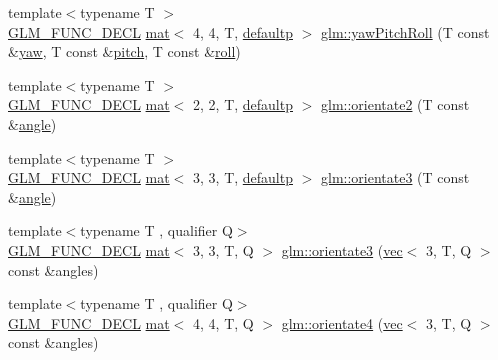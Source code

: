 \begin{DoxyCompactItemize}
\item 
{\footnotesize template$<$typename T $>$ }\\\mbox{\hyperlink{setup_8hpp_ab2d052de21a70539923e9bcbf6e83a51}{G\+L\+M\+\_\+\+F\+U\+N\+C\+\_\+\+D\+E\+CL}} \mbox{\hyperlink{structglm_1_1mat}{mat}}$<$ 4, 4, T, \mbox{\hyperlink{namespaceglm_a36ed105b07c7746804d7fdc7cc90ff25a9d21ccd8b5a009ec7eb7677befc3bf51}{defaultp}} $>$ \mbox{\hyperlink{group__gtx__euler__angles_gae6aa26ccb020d281b449619e419a609e}{glm\+::yaw\+Pitch\+Roll}} (T const \&\mbox{\hyperlink{group__gtc__quaternion_ga53feffeb4001b99e36e216522e465e9e}{yaw}}, T const \&\mbox{\hyperlink{group__gtc__quaternion_ga9bd78e5fe153d07e39fb4c83e73dba73}{pitch}}, T const \&\mbox{\hyperlink{group__gtc__quaternion_ga3ff93afbd9cc29f2ad217f2228e8a95b}{roll}})
\item 
{\footnotesize template$<$typename T $>$ }\\\mbox{\hyperlink{setup_8hpp_ab2d052de21a70539923e9bcbf6e83a51}{G\+L\+M\+\_\+\+F\+U\+N\+C\+\_\+\+D\+E\+CL}} \mbox{\hyperlink{structglm_1_1mat}{mat}}$<$ 2, 2, T, \mbox{\hyperlink{namespaceglm_a36ed105b07c7746804d7fdc7cc90ff25a9d21ccd8b5a009ec7eb7677befc3bf51}{defaultp}} $>$ \mbox{\hyperlink{group__gtx__euler__angles_gae16738a9f1887cf4e4db6a124637608d}{glm\+::orientate2}} (T const \&\mbox{\hyperlink{_s_d_l__opengl__glext_8h_a9e06c1f76a20fed54ca742cd25cb02c4}{angle}})
\item 
{\footnotesize template$<$typename T $>$ }\\\mbox{\hyperlink{setup_8hpp_ab2d052de21a70539923e9bcbf6e83a51}{G\+L\+M\+\_\+\+F\+U\+N\+C\+\_\+\+D\+E\+CL}} \mbox{\hyperlink{structglm_1_1mat}{mat}}$<$ 3, 3, T, \mbox{\hyperlink{namespaceglm_a36ed105b07c7746804d7fdc7cc90ff25a9d21ccd8b5a009ec7eb7677befc3bf51}{defaultp}} $>$ \mbox{\hyperlink{group__gtx__euler__angles_ga7ca98668a5786f19c7b38299ebbc9b4c}{glm\+::orientate3}} (T const \&\mbox{\hyperlink{_s_d_l__opengl__glext_8h_a9e06c1f76a20fed54ca742cd25cb02c4}{angle}})
\item 
{\footnotesize template$<$typename T , qualifier Q$>$ }\\\mbox{\hyperlink{setup_8hpp_ab2d052de21a70539923e9bcbf6e83a51}{G\+L\+M\+\_\+\+F\+U\+N\+C\+\_\+\+D\+E\+CL}} \mbox{\hyperlink{structglm_1_1mat}{mat}}$<$ 3, 3, T, Q $>$ \mbox{\hyperlink{group__gtx__euler__angles_ga7238c8e15c7720e3ca6a45ab151eeabb}{glm\+::orientate3}} (\mbox{\hyperlink{structglm_1_1vec}{vec}}$<$ 3, T, Q $>$ const \&angles)
\item 
{\footnotesize template$<$typename T , qualifier Q$>$ }\\\mbox{\hyperlink{setup_8hpp_ab2d052de21a70539923e9bcbf6e83a51}{G\+L\+M\+\_\+\+F\+U\+N\+C\+\_\+\+D\+E\+CL}} \mbox{\hyperlink{structglm_1_1mat}{mat}}$<$ 4, 4, T, Q $>$ \mbox{\hyperlink{group__gtx__euler__angles_ga4a044653f71a4ecec68e0b623382b48a}{glm\+::orientate4}} (\mbox{\hyperlink{structglm_1_1vec}{vec}}$<$ 3, T, Q $>$ const \&angles)

\end{DoxyCompactItemize}
